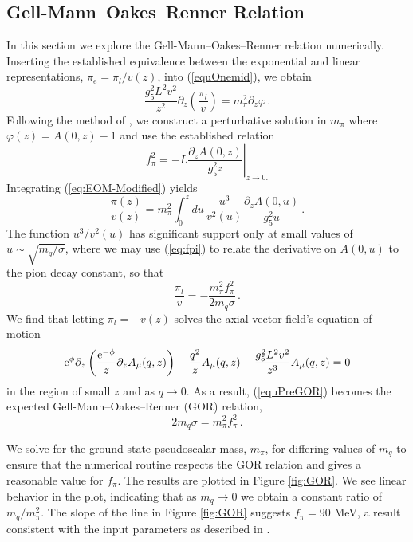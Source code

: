 \subsection{Gell-Mann--Oakes--Renner Relation}

In this section we explore the Gell-Mann--Oakes--Renner relation numerically.
Inserting the established equivalence between the exponential and linear representations, $\pi_{e}=\pi_{l}/v(z)$, into (\ref{equOnemid}), we obtain 
\begin{equation}
\frac{g_{5}^{2}L^{2}v^{2}}{z^{2}}\partial_{z}\left(\frac{\pi_{l}}{v}\right)=m_{\pi}^{2}\partial_{z}\varphi\,.\label{eq:EOM-Modified}
\end{equation}
 Following the method of \cite{stephanov-katz-son}, we construct a perturbative solution in $m_{\pi}$ where $\varphi(z)=A(0,z)-1$ and use the established relation
\begin{equation}
f_{\pi}^{2}=-\left.L\frac{\partial_{z}A(0,z)}{g_{5}^{2}z}\right|_{z\rightarrow0.}\label{eq:fpi}
\end{equation}
Integrating (\ref{eq:EOM-Modified}) yields 
\begin{equation}
\frac{\pi(z)}{v(z)}=m_{\pi}^{2}\int_{0}^{z}du\,\frac{u^{3}}{v^{2}(u)}\frac{\partial_{z}A(0,u)}{g_{5}^{2}u}\,.
\end{equation}
The function $u^{3}/v^{2}(u)$ has significant support only at small values of $u\sim\sqrt{m_{q}/\sigma}$, where we may use (\ref{eq:fpi}) to relate the derivative on $A(0,u)$ to the pion decay constant, so that 
\begin{equation}
\frac{\pi_{l}}{v}=-\frac{m_{\pi}^{2}f_{\pi}^{2}}{2m_{q}\sigma}\,.\label{equPreGOR}
\end{equation}
We find that letting $\pi_{l}=-v(z)$ solves the axial-vector field's equation of motion 
\begin{equation}
{\rm e}^{\phi}\partial_{z}\left(\frac{{\rm e}^{-\phi}}{z}\partial_{z}A_{\mu}(q,z)\right)-\frac{q^{2}}{z}A_{\mu}(q,z)-\frac{g_{5}^{2}L^{2}v^{2}}{z^{3}}A_{\mu}(q,z)=0
\end{equation}
 in the region of small $z$ and as $q\rightarrow0$. 
 As a result, (\ref{equPreGOR}) becomes the expected Gell-Mann--Oakes--Renner (GOR)
relation, 
\begin{equation}
2m_{q}\sigma=m_{\pi}^{2}f_{\pi}^{2}\,.\label{eq:GOR}
\end{equation}

We solve for the ground-state pseudoscalar mass, $m_{\pi}$, for
differing values of $m_{q}$ to ensure that the numerical routine
respects the GOR relation and gives a reasonable value for $f_{\pi}$.
The results are plotted in Figure \ref{fig:GOR}. We see linear behavior
in the plot, indicating that as $m_{q}\rightarrow0$ we obtain a constant
ratio of $m_{q}/m_{\pi}^{2}$. The slope of the line in Figure \ref{fig:GOR}
suggests $f_{\pi}=90$ MeV, a result consistent with the input parameters
as described in \cite{gherghetta-kelley}.

